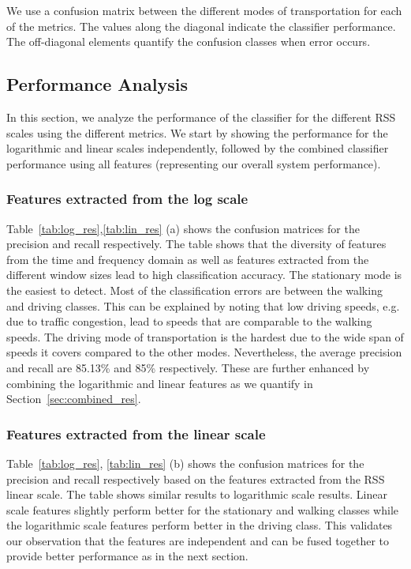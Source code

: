 \documentclass[conference]{IEEEtran}
\begin{document}
We use a confusion matrix between the different modes of transportation for each of the metrics. The values along the diagonal indicate the classifier performance. The off-diagonal elements quantify the confusion classes when error occurs. \subsection{Performance Analysis}\label{Panalysis}
In this section, we analyze the performance of the classifier for the different RSS scales using the different metrics. We start by showing the performance for the logarithmic and linear scales independently, followed by the combined classifier performance using all features (representing our overall system performance).  
\subsubsection{Features extracted from the log scale}
Table~\ref{tab:log_res},\ref{tab:lin_res} (a)  shows the confusion matrices for the precision and recall respectively. The table shows that the diversity of features from the time and frequency domain as well as features extracted from the different window sizes lead to high classification accuracy. The stationary mode is the easiest to detect. Most of the classification errors are between the walking and driving classes. This can be explained by noting that low driving speeds, e.g. due to traffic congestion, lead to speeds that are comparable to the walking speeds. The driving mode of transportation is the hardest due to the wide span of speeds it covers compared to the other modes. Nevertheless, the average precision and recall are 85.13\% and 85\% respectively. These are further enhanced by combining the logarithmic and linear features as we quantify in Section~\ref{sec:combined_res}.

\subsubsection{Features extracted from the linear scale}
Table~\ref{tab:log_res}, \ref{tab:lin_res} (b) shows the confusion matrices for the precision and recall respectively based on the features extracted from the RSS linear scale. The table shows similar results to logarithmic scale results. Linear scale features slightly perform better for the stationary and walking classes while the logarithmic scale features perform better in the driving class. This validates our observation that the features are independent and can be fused together to provide better performance as in the next section.
\end{document}
